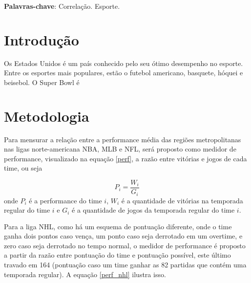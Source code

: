 \documentclass[12pt,oneside,a4paper,chapter=TITLE,english,brazil,sumario=abnt-6027-2012]{abntex2}
\begin{document}
	
\clearpage\maketitle
\thispagestyle{empty}
\setlength{\absparsep}{18pt} 
\begin{resumo}
	
	
	\noindent
	
	\textbf{Palavras-chave}:  Correlação. Esporte.   
\end{resumo}


	
	\tableofcontents*
	\cleardoublepage
	
	
	
	\textual 
	\pagestyle{simple}
	
\chapter{Introdução}

	Os Estados Unidos é um país conhecido pelo seu ótimo desempenho no esporte. Entre os esportes mais populares, estão o futebol americano, basquete, hóquei e beisebol. O Super Bowl é 
	


\chapter{Metodologia}

	Para mensurar a relação entre a performance média das regiões metropolitanas nas ligas norte-americana NBA, MLB e NFL, será proposto como medidor de performance, visualizado na equação \ref{perf}, a razão entre vitórias e jogos de cada time, ou seja
	
	\begin{equation}
		P_i = \frac{W_i}{G_i}
		\label{perf}
	\end{equation}
	onde $P_i$ é a performance do time $i$, $W_i$ é a quantidade de vitórias na temporada regular do time $i$ e $G_i$ é a quantidade de jogos da temporada regular do time $i$.
	
	Para a liga NHL, como há um esquema de pontuação diferente, onde o time ganha dois pontos caso vença, um ponto caso seja derrotado em um overtime, e zero caso seja derrotado no tempo normal, o medidor de performance é proposto a partir da razão entre pontuação do time e pontuação possível, este último travado em 164 (pontuação caso um time ganhar as 82 partidas que contém uma temporada regular). A equação \ref{perf_nhl} ilustra isso.
	
\end{document}
